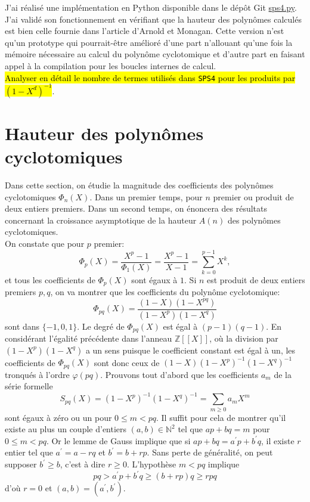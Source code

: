 \documentclass{article}
\newcounter{lemme}
\theoremstyle{break}                  %
\begin{document}
J'ai réalisé une implémentation en Python disponible dans le dépôt Git \href{https://github.com/jpmjpmjpm/cyclotom-fast/blob/master/cyclotomfast/sps4.py}{sps4.py}. J'ai validé son fonctionnement en vérifiant que la hauteur des polynômes calculés est bien celle fournie dans l'article d'Arnold et Monagan. Cette version n'est qu'un prototype qui pourrait-être amélioré d'une part n'allouant qu'une fois la mémoire nécessaire au calcul du polynôme cyclotomique et d'autre part en faisant appel à la compilation pour les boucles internes de calcul.\\


\hl{Analyser en détail le nombre de termes utilisés dans \texttt{SPS4} pour les produits par $(1-X^d)^{-1}$}.\\

\section*{Hauteur des polynômes cyclotomiques}\label{sec:hauteur}
Dans cette section, on étudie la magnitude des coefficients des polynômes cyclotomiques $\Phi_n(X)$. Dans un premier temps, pour $n$ premier ou produit de deux entiers premiers. Dans un second temps, on énoncera des résultats concernant la croissance asymptotique de la hauteur $A(n)$ des polynômes cyclotomiques.\\


On constate que pour $p$ premier:
$$\Phi_p(X) = \frac{X^p-1}{\Phi_1(X)} = \frac{X^p-1}{X-1} = \sum_{k=0}^{p-1} X^k,$$
et tous les coefficients de $\Phi_p(X)$ sont égaux à $1$. Si $n$ est produit de deux entiers premiers $p,q$, on va montrer que les coefficients du polynôme cyclotomique:
$$\Phi_{pq}(X) = \frac{(1-X)(1-X^{pq})}{(1-X^p)(1-X^q)}$$ sont dans $\{-1, 0, 1\}$. Le degré de $\Phi_{pq}(X)$ est égal à $(p-1)(q-1)$. En considérant l'égalité précédente dans l'anneau $\mathbb Z[[X]]$, où la division par $(1-X^p)(1-X^q)$ a un sens puisque le coefficient constant est égal à un, les coefficients de $\Phi_{pq}(X)$ sont donc ceux de $(1-X)(1-X^p)^{-1}(1-X^q)^{-1}$ tronqués à l'ordre $\varphi(pq)$. Prouvons tout d'abord que les coefficients $a_m$ de la série formelle
$$S_{pq}(X) = (1-X^p)^{-1}(1-X^q)^{-1} = \sum_{m \ge 0} a_m X^m$$ sont égaux à zéro ou un pour $0 \le m < pq$. Il suffit pour cela de montrer qu'il existe au plus un couple d'entiers $(a,b) \in \mathbb N^2$ tel que $ap+bq = m$ pour $0 \le m < pq$. Or le lemme de Gauss implique que si $ap+bq = a^\prime p + b^\prime q$, il existe $r$ entier tel que $a^\prime = a -rq$ et $b^\prime = b +rp$. Sans perte de généralité, on peut supposer $b^\prime \ge b$, c'est à dire $r \ge 0$. L'hypothèse $m <pq$ implique
$$pq > a^\prime p + b^\prime q \ge (b + r p)q \ge rpq$$ d'où $r=0$ et $(a,b)=(a^\prime, b^\prime)$.
\end{document}

